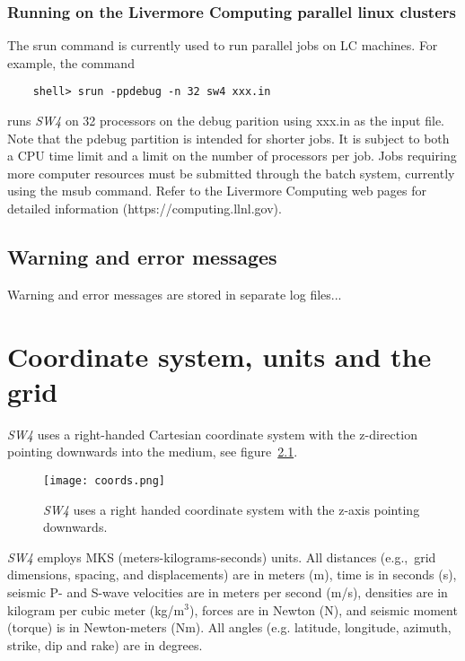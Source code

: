 \documentclass[11pt]{report}
\begin{document}
\subsection{Running on the Livermore Computing parallel linux clusters}
%
The srun command is currently used to run parallel jobs on LC machines. For example, the command
\begin{verbatim}
	shell> srun -ppdebug -n 32 sw4 xxx.in
\end{verbatim}
runs \emph{SW4} on 32 processors on the debug parition using xxx.in as the input file. Note that the
pdebug partition is intended for shorter jobs. It is subject to both a CPU time limit and a limit on
the number of processors per job. Jobs requiring more computer resources must be submitted through
the batch system, currently using the msub command. Refer to the Livermore Computing web pages for
detailed information (https://computing.llnl.gov).

\section{Warning and error messages}

Warning and error messages are stored in separate log files...

\chapter{Coordinate system, units and the grid}
%
\emph{SW4} uses a right-handed Cartesian coordinate system with the z-direction pointing
downwards into the medium, see figure~\ref{fig:coordsys}. 
\begin{figure}[th]
\begin{centering}
 \texttt{[image: coords.png]}
  \caption{\emph{SW4} uses a right handed coordinate system with the z-axis pointing
  downwards.}
  \label{fig:coordsys}
\end{centering}
\end{figure}
\emph{SW4} employs MKS (meters-kilograms-seconds) units. All distances (e.g.,~grid dimensions,
spacing, and displacements) are in meters (m), time is in seconds (s), seismic P- and S-wave
velocities are in meters per second (m/s), densities are in kilogram per cubic meter (kg/m$^3$),
forces are in Newton (N), and seismic moment (torque) is in Newton-meters (Nm). All angles
(e.g. latitude, longitude, azimuth, strike, dip and rake) are in degrees. 
\end{document}
